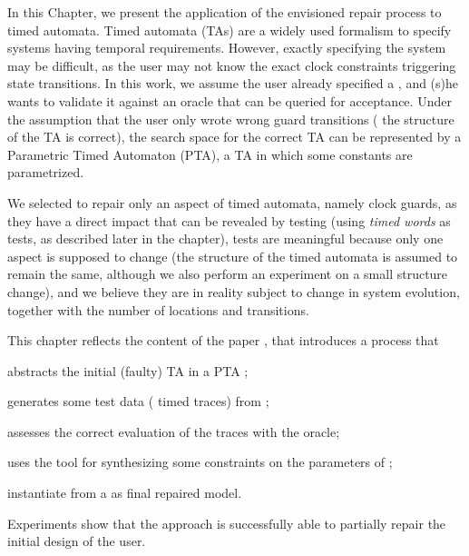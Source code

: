 \begin{tikzborder}{\cite{Gargantini16:validation}}
\begin{tikzborder}{\cite{gargantini_combinatorial_2017}}
\begin{tikzborder}{\cite{gargantini_combinatorial_2017}}
\begin{tikzborder}{\cite{garn2019}}
\begin{tikzborder}{\cite{arcaini2019achieving}}
\begin{tikzborder}{\cite{arcaini2019varivolution}}
In this Chapter, we present the application of the envisioned repair process to timed automata.
Timed automata (TAs) \cite{AD94} are a widely used formalism to specify systems having temporal requirements. However, exactly specifying the system may be difficult, as the user may not know the exact clock constraints triggering state transitions. In this work, we assume the user already specified a \ta, and (s)he wants to validate it against an oracle that can be queried for acceptance. Under the assumption that the user only wrote wrong guard transitions (\ie{} the structure of the TA is correct), the search space for the correct TA can be represented by a Parametric Timed Automaton (PTA), \ie{} a TA in which some constants are parametrized.

We selected to repair only an aspect of timed automata, namely clock guards, as they have a direct impact that can be revealed by testing (using \textit{timed words} as tests, as described later in the chapter), tests are meaningful because only one aspect is supposed to change (the structure of the timed automata is assumed to remain the same, although we also perform an experiment on a small structure change), and we believe they are in reality subject to change in system evolution, together with the number of locations and transitions.

This chapter reflects the content of the paper \cite{andre_tap_2019}, that introduces a process that
%
\begin{inparaenum}[(i)]
	\item abstracts the initial (faulty) TA \initTa in a PTA \ptaProc;
	\item generates some test data (\ie{} timed traces) from \ptaProc;
	\item assesses the correct evaluation of the traces with the oracle;
	\item uses the \imitator tool for synthesizing some constraints \ptaConstr on the parameters of \ptaProc;
	\item instantiate from \ptaConstr a \ta \repTa as final repaired model.
\end{inparaenum}
%
Experiments show that the approach is successfully able to partially repair the initial design of the user.



\end{tikzborder}
\end{tikzborder}
\end{tikzborder}
\end{tikzborder}
\end{tikzborder}
\end{tikzborder}
